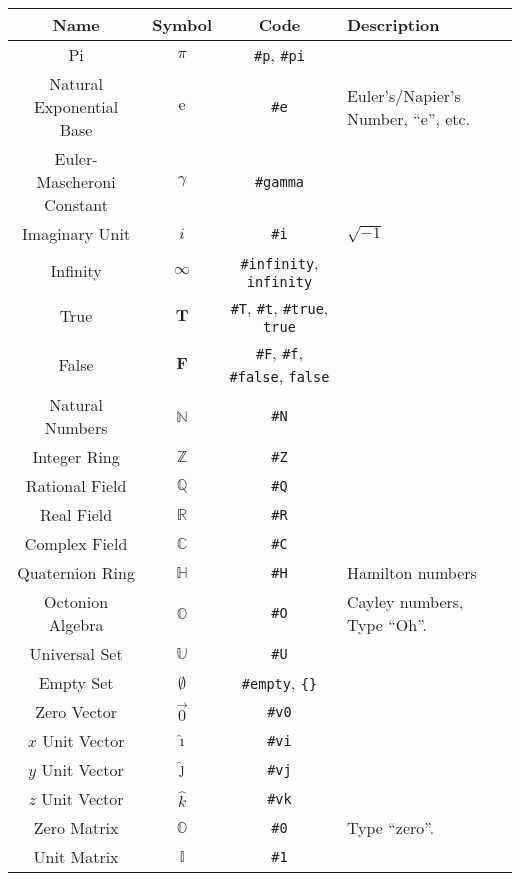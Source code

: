 \documentclass{article}
\begin{document}
  \begin{table}[!h]
    \centering
    \begin{tabular}{|c|c|c|l|}
      \hline
      \textbf{Name} & \textbf{Symbol} & \textbf{Code} & \textbf{Description} \\
      \hline\hline
      
      Pi & \( \pi \) & \texttt{\#p}, \texttt{\#pi} & \\
      Natural Exponential Base & \( \mathrm{e} \) & \texttt{\#e} & Euler's/Napier's Number, ``e'', etc. \\
      Euler-Mascheroni Constant & \( \gamma \) & \texttt{\#gamma} & \\
      Imaginary Unit & \( i \) & \texttt{\#i} & \( \sqrt{-1} \) \\
      Infinity & \( \infty \) & \texttt{\#infinity}, \texttt{infinity} & \\
      \hline
      True & \( \mathbf{T} \) & \texttt{\#T}, \texttt{\#t}, \texttt{\#true}, \texttt{true} & \\
      False & \( \mathbf{F} \) & \texttt{\#F}, \texttt{\#f}, \texttt{\#false}, \texttt{false} & \\
      \hline
      Natural Numbers & \( \mathbb{N} \) & \texttt{\#N} & \\
      Integer Ring & \( \mathbb{Z} \) & \texttt{\#Z} & \\
      Rational Field & \( \mathbb{Q} \) & \texttt{\#Q} & \\
      Real Field & \( \mathbb{R} \) & \texttt{\#R} & \\
      Complex Field & \( \mathbb{C} \) & \texttt{\#C} & \\
      Quaternion Ring & \( \mathbb{H} \) & \texttt{\#H} & Hamilton numbers\\
      Octonion Algebra & \( \mathbb{O} \) & \texttt{\#O} & Cayley numbers, Type ``Oh''.\\
      \hline
      Universal Set & \( \mathbb{U} \) & \texttt{\#U} & \\
      Empty Set & \( \emptyset \) & \texttt{\#empty}, \texttt{\{\}} & \\
      \hline
      Zero Vector & \( \vec0 \) & \texttt{\#v0} & \\
      \( x \) Unit Vector & \( \hat\imath \) & \texttt{\#vi} & \\
      \( y \) Unit Vector & \( \hat\jmath \) & \texttt{\#vj} & \\
      \( z \) Unit Vector & \( \hat{k} \) & \texttt{\#vk} & \\
      Zero Matrix & \( \mathbb{O} \) & \texttt{\#0} & Type ``zero''.\\
      Unit Matrix & \( \mathbb{I} \) & \texttt{\#1} & \\
      \hline
    \end{tabular}
  \end{table}
  
\end{document}
